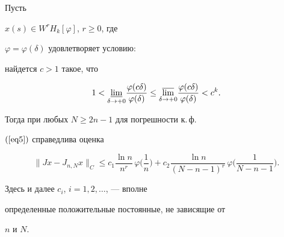 \begin{thm}\label{th1} Пусть


$x(s)\in W^rH_k[\varphi]$, $r\geq0$, где


$\varphi=\varphi(\delta)$ удовлетворяет условию\/${:}$


найдется $c>1$ такое, что


\begin{equation}\label{eq6}


1<\underset{\delta\to+0}\varliminf


\frac{\varphi(c\delta)}{\varphi(\delta)}\leq


\underset{\delta\to+0}\varlimsup\frac{\varphi(c\delta)}{\varphi(\delta)}<c^k.


\end{equation}


Тогда при любых $N\geq2n-1$ для погрешности к.\,ф.


$(\ref{eq5})$ справедлива оценка


\begin{equation}\label{eq7}


\|Jx-J_{n,N}x\|_C\leq c_1\frac{\ln


n}{n^r}\,\varphi\bigg(\frac{1}{n}\bigg)+c_2\frac{\ln


n}{(N-n-1)^r}\,\varphi\bigg(\frac{1}{N-n-1}\bigg).


\end{equation}


Здесь и далее $c_i$, $i=1,2,\dotsc$, --- вполне


определенные положительные постоянные,  не зависящие от


$n$ и $N$.


\end{thm}








